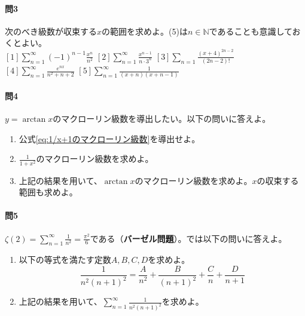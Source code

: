 \documentclass[a4j,dvipdfmx]{jsarticle}
\begin{document}
            \paragraph{問3}次のべき級数が収束する$x$の範囲を求めよ。{\scriptsize (5)は$n\in\mathbb{N}$であることも意識しておくとよい。}\\
            $\displaystyle [1]\sum_{n=1}^{\infty}(-1)^{n-1}\frac{x^n}{n^2}$\hspace{3mm}
            $\displaystyle [2]\sum_{n=1}^{\infty}\frac{x^{n-1}}{n\cdot 3^n}$\hspace{3mm}
            $\displaystyle [3]\sum_{n=1}\frac{(x+4)^{2n-2}}{(2n-2)!}$\hspace{3mm}
            $\displaystyle [4]\sum_{n=1}^{\infty}\frac{e^{nx}}{n^2+n+2}$\hspace{3mm}
            $\displaystyle [5]\sum_{n=1}^{\infty}\frac{1}{(x+n)(x+n-1)}$

            \paragraph{問4}$y=\arctan x$のマクローリン級数を導出したい。以下の問いに答えよ。
            \begin{enumerate}\setcounter{enumi}{0}\renewcommand{\labelenumi}{(\arabic{enumi})}
                \item 公式\eqref{eq:1/x+1のマクローリン級数}を導出せよ。
                \item $\displaystyle \frac{1}{1+x^2}$のマクローリン級数を求めよ。
                \item 上記の結果を用いて、$\arctan x$のマクローリン級数を求めよ。$x$の収束する範囲も求めよ。
            \end{enumerate}

            \paragraph{問5}$\displaystyle \zeta(2)= \sum_{n=1}^{\infty}\frac{1}{n^2}=\frac{\pi^2}{6}$である（\textbf{バーゼル問題}）。では以下の問いに答えよ。
            \begin{enumerate}\setcounter{enumi}{0}\renewcommand{\labelenumi}{(\arabic{enumi})}
                \item 以下の等式を満たす定数$A,B,C,D$を求めよ。
                    \begin{equation*}
                        \frac{1}{n^2(n+1)^2}=\frac{A}{n^2}+\frac{B}{(n+1)^2}+\frac{C}{n}+\frac{D}{n+1}
                    \end{equation*}
                \item 上記の結果を用いて、$\displaystyle\sum_{n=1}^{\infty}\frac{1}{n^2(n+1)^2}$を求めよ。
            \end{enumerate}
\end{document}
